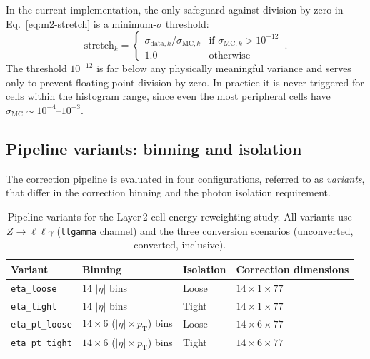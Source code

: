 \documentclass[11pt,a4paper]{article}
\newcommand{\abseta}{\ensuremath{|\eta|}}
\newcommand{\pt}{\ensuremath{p_{\mathrm{T}}}}
\begin{document}
In the current implementation, the only safeguard against division by
zero in Eq.~\eqref{eq:m2-stretch} is a minimum-$\sigma$ threshold:
\begin{equation}
  \text{stretch}_k =
  \begin{cases}
    \sigma_{\text{data},k} / \sigma_{\text{MC},k}
      & \text{if } \sigma_{\text{MC},k} > 10^{-12} \\
    1.0 & \text{otherwise}
  \end{cases}
  \,.
  \label{eq:stretch-safeguard}
\end{equation}
The threshold $10^{-12}$ is far below any physically meaningful variance
and serves only to prevent floating-point division by zero.  In practice
it is never triggered for cells within the histogram range, since even
the most peripheral cells have $\sigma_{\text{MC}} \sim 10^{-4}$--$10^{-3}$.


\subsection{Pipeline variants: binning and isolation}
\label{sec:variants}

The correction pipeline is evaluated in four configurations, referred to
as \emph{variants}, that differ in the correction binning and the photon
isolation requirement.

\begin{table}[htbp]
\centering
\caption{Pipeline variants for the Layer\,2 cell-energy reweighting study.
  All variants use $Z \to \ell\ell\gamma$ (\texttt{llgamma} channel) and
  the three conversion scenarios (unconverted, converted, inclusive).}
\label{tab:variants}
\begin{tabular}{llll}
\toprule
Variant & Binning & Isolation & Correction dimensions \\
\midrule
\texttt{eta\_loose}     & 14 $\abseta$ bins                        & Loose & $14 \times 1 \times 77$ \\
\texttt{eta\_tight}     & 14 $\abseta$ bins                        & Tight & $14 \times 1 \times 77$ \\
\texttt{eta\_pt\_loose} & $14 \times 6$ ($\abseta \times \pt$) bins & Loose & $14 \times 6 \times 77$ \\
\texttt{eta\_pt\_tight} & $14 \times 6$ ($\abseta \times \pt$) bins & Tight & $14 \times 6 \times 77$ \\
\bottomrule
\end{tabular}
\end{table}
\end{document}
